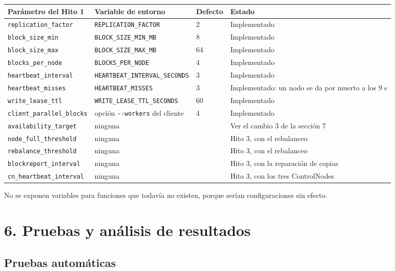 \documentclass[10pt]{article}
\begin{document}
\begin{xltabular}{\linewidth}{@{}L{4.1cm}L{4.8cm}L{1.3cm}Y@{}}
\toprule
Parámetro del Hito 1 & Variable de entorno & Defecto & Estado \\
\midrule\endhead
\texttt{replication\_factor} & \texttt{REPLICATION\_FACTOR} & 2 & Implementado \\
\texttt{block\_size\_min} & \texttt{BLOCK\_SIZE\_MIN\_MB} & 8 & Implementado \\
\texttt{block\_size\_max} & \texttt{BLOCK\_SIZE\_MAX\_MB} & 64 & Implementado \\
\texttt{blocks\_per\_node} & \texttt{BLOCKS\_PER\_NODE} & 4 & Implementado \\
\texttt{heartbeat\_interval} & \texttt{HEARTBEAT\_INTERVAL\_SECONDS} & 3 & Implementado \\
\texttt{heartbeat\_misses} & \texttt{HEARTBEAT\_MISSES} & 3 & Implementado: un nodo se da por muerto a los 9 s \\
\texttt{write\_lease\_ttl} & \texttt{WRITE\_LEASE\_TTL\_SECONDS} & 60 & Implementado \\
\texttt{client\_parallel\_blocks} & opción \texttt{-{}-workers} del cliente & 4 & Implementado \\
\texttt{availability\_target} & ninguna & & Ver el cambio 3 de la sección 7 \\
\texttt{node\_full\_threshold} & ninguna & & Hito 3, con el rebalanceo \\
\texttt{rebalance\_threshold} & ninguna & & Hito 3, con el rebalanceo \\
\texttt{blockreport\_interval} & ninguna & & Hito 3, con la reparación de copias \\
\texttt{cn\_heartbeat\_interval} & ninguna & & Hito 3, con los tres ControlNodes \\
\bottomrule
\end{xltabular}

No se exponen variables para funciones que todavía no existen, porque serían configuraciones sin efecto.

\separador

\section{6. Pruebas y análisis de resultados}

\subsection{Pruebas automáticas}
\end{document}
